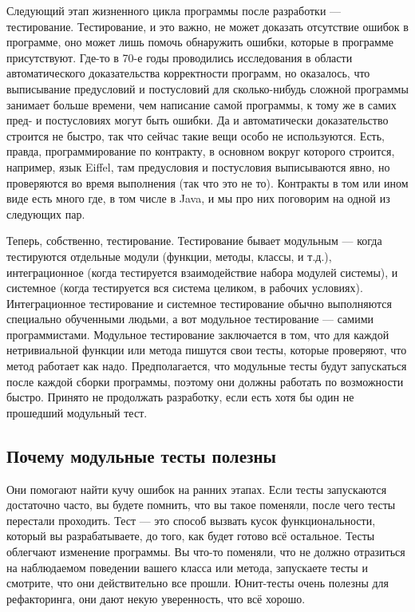 \documentclass[a5paper]{article}
\begin{document}
Следующий этап жизненного цикла программы после разработки --- тестирование. Тестирование, и это важно, не может доказать отсутствие ошибок в программе, оно может лишь помочь обнаружить ошибки, которые в программе присутствуют. Где-то в 70-е годы проводились исследования в области автоматического доказательства корректности программ, но оказалось, что выписывание предусловий и постусловий для сколько-нибудь сложной программы занимает больше времени, чем написание самой программы, к тому же в самих пред- и постусловиях могут быть ошибки. Да и автоматически доказательство строится не быстро, так что сейчас такие вещи особо не используются. Есть, правда, программирование по контракту, в основном вокруг которого строится, например, язык Eiffel, там предусловия и постусловия выписываются явно, но проверяются во время выполнения (так что это не то). Контракты в том или ином виде есть много где, в том числе в Java, и мы про них поговорим на одной из следующих пар.

Теперь, собственно, тестирование. Тестирование бывает модульным --- когда тестируются отдельные модули (функции, методы, классы, и т.д.), интеграционное (когда тестируется взаимодействие набора модулей системы), и системное (когда тестируется вся система целиком, в рабочих условиях). Интеграционное тестирование и системное тестирование обычно выполняются специально обученными людьми, а вот модульное тестирование --- самими программистами. Модульное тестирование заключается в том, что для каждой нетривиальной функции или метода пишутся свои тесты, которые проверяют, что метод работает как надо. Предполагается, что модульные тесты будут запускаться после каждой сборки программы, поэтому они должны работать по возможности быстро. Принято не продолжать разработку, если есть хотя бы один не прошедший модульный тест.

\subsection{Почему модульные тесты полезны}

Они помогают найти кучу ошибок на ранних этапах. Если тесты запускаются достаточно часто, вы будете помнить, что вы такое поменяли, после чего тесты перестали проходить.
Тест --- это способ вызвать кусок функциональности, который вы разрабатываете, до того, как будет готово всё остальное.
Тесты облегчают изменение программы. Вы что-то поменяли, что не должно отразиться на наблюдаемом поведении вашего класса или метода, запускаете тесты и смотрите, что они действительно все прошли. Юнит-тесты очень полезны для рефакторинга, они дают некую уверенность, что всё хорошо.
\end{document}
